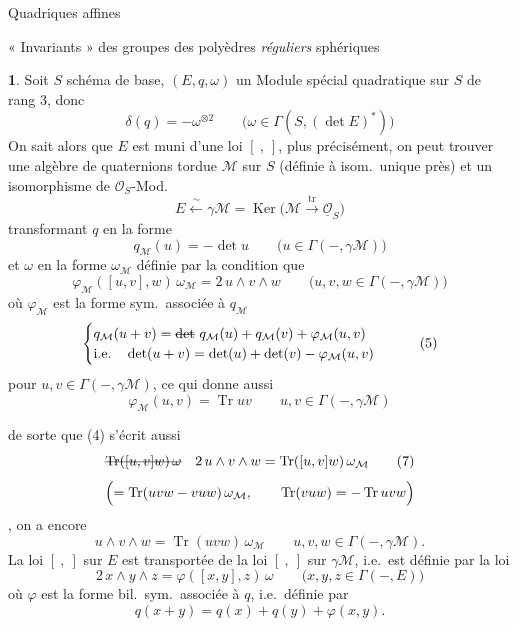 \documentclass[11pt,a4paper]{article}
\begin{document}
Quadriques affines 

« Invariants » des groupes des polyèdres \emph{réguliers} sphériques

\textbf{1}. Soit $S$ schéma de base, $(E,q,\omega)$ un Module spécial quadratique sur $S$ de rang $3$, donc
\[
\delta(q)=-\omega^{\otimes 2}\qquad \bigl(\omega\in\Gamma(S,(\det E)^{*})\bigr) \tag{1}
\]
On sait alors que $E$ est muni d'une loi $[\ ,\ ]$, plus précisément, on peut trouver une algèbre de quaternions tordue $\mathcal{M}$ sur $S$ (définie à isom.\ unique près) et un isomorphisme de $\mathcal{O}_S$-Mod.
\[
E\xleftarrow{\ \sim\ }\gamma\mathcal{M}=\operatorname{Ker}\bigl(\mathcal{M}\xrightarrow{\ \mathrm{tr}\ }\underline{\mathcal{O}}_S\bigr) \tag{2}
\]
transformant $q$ en la forme
\[
q_{\mathcal{M}}(u)=-\det u\qquad \bigl(u\in\Gamma(-,\gamma\mathcal{M})\bigr) \tag{3}
\]
et $\omega$ en la forme $\omega_{\mathcal{M}}$ définie par la condition que
\[
\varphi_{\mathcal{M}}([u,v],w)\,\omega_{\mathcal{M}}=2\,u\wedge v\wedge w\qquad \bigl(u,v,w\in\Gamma(-,\gamma\mathcal{M})\bigr) \tag{4}
\]
où $\varphi_{\mathcal{M}}$ est la forme \struck{\ill{}}  sym.\ associée à $q_{\mathcal{M}}$
\[
\begin{cases}
q_{\mathcal{M}}(u+v)=\text{\struck{$\det$}}\ q_{\mathcal{M}}(u)+q_{\mathcal{M}}(v)+\varphi_{\mathcal{M}}(u,v) \\
\text{i.e.}\quad \det(u+v)=\det(u)+\det(v)-\varphi_{\mathcal{M}}(u,v)
\end{cases} \tag{5}
\]
pour $u,v\in\Gamma(-,\gamma\mathcal{M})$, ce qui donne aussi
\[
\varphi_{\mathcal{M}}(u,v)=\operatorname{Tr}uv\qquad u,v\in\Gamma(-,\gamma\mathcal{M}) \tag{6}
\]

de sorte que (4) s'écrit aussi
\[
\text{\struck{$\operatorname{Tr}([u,v]w)\,\omega$}}\quad 2\,u\wedge v\wedge w=\operatorname{Tr}([u,v]w)\,\omega_{\mathcal{M}} \tag{7}
\]
\[
\Bigl(=\operatorname{Tr}(uvw-vuw)\,\omega_{\mathcal{M}},\qquad \operatorname{Tr}(vuw)=-\operatorname{Tr}uvw\Bigr)
\]
, on a encore
\[
u\wedge v\wedge w=\operatorname{Tr}(uvw)\,\omega_{\mathcal{M}}\qquad u,v,w\in\Gamma(-,\gamma\mathcal{M}). \tag{8}
\]
La loi $[\ ,\ ]$ sur $E$ est transportée de la loi $[\ ,\ ]$ sur $\gamma\mathcal{M}$, i.e.\ est définie par la loi
\[
2\,x\wedge y\wedge z=\varphi([x,y],z)\,\omega\qquad \bigl(x,y,z\in\Gamma(-,E)\bigr) \tag{8}
\]
où $\varphi$ est la forme bil.\ sym.\ associée à $q$, i.e.\ définie par
\[
q(x+y)=q(x)+q(y)+\varphi(x,y). \tag{9}
\]
\end{document}
